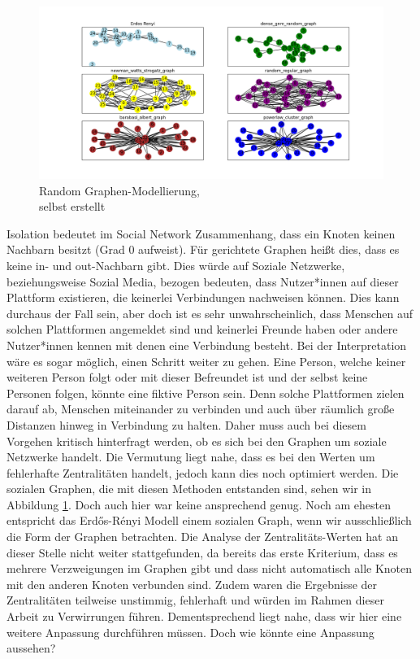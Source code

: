 \FloatBarrier
\begin{figure}[h!]
    \centering
    \hspace*{-1.5cm}
    \includegraphics[width=1.2\textwidth]{Graphics/6Random.png}
    \caption{Random Graphen-Modellierung, \\
    selbst erstellt}
    \label{RandomGraphen}
\end{figure}

\newpage
Isolation bedeutet im Social Network Zusammenhang, dass ein Knoten keinen Nachbarn besitzt (Grad $0$ aufweist).
Für gerichtete Graphen heißt dies, dass es keine in- und out-Nachbarn gibt. Dies würde auf Soziale Netzwerke, beziehungsweise Sozial Media, bezogen bedeuten, dass Nutzer*innen auf dieser Plattform existieren, die keinerlei Verbindungen nachweisen können. Dies kann durchaus der Fall sein, aber doch ist es sehr unwahrscheinlich, dass Menschen auf solchen Plattformen angemeldet sind und keinerlei Freunde haben oder andere Nutzer*innen kennen mit denen eine Verbindung besteht. Bei der Interpretation wäre es sogar möglich, einen Schritt weiter zu gehen. Eine Person, welche keiner weiteren Person folgt oder mit dieser Befreundet ist und der selbst keine Personen folgen, könnte eine fiktive Person sein. Denn solche Plattformen zielen darauf ab, Menschen miteinander zu verbinden und auch über räumlich große Distanzen hinweg in Verbindung zu halten. Daher muss auch bei diesem Vorgehen kritisch hinterfragt werden, ob es sich bei den Graphen um soziale Netzwerke handelt. Die Vermutung liegt nahe, dass es bei den Werten um fehlerhafte Zentralitäten handelt, jedoch kann dies noch optimiert werden.
Die sozialen Graphen, die mit diesen Methoden entstanden sind, sehen wir in Abbildung \ref{RandomGraphen}. Doch auch hier war keine ansprechend genug. Noch am ehesten entspricht das Erdős-Rényi Modell einem sozialen Graph, wenn wir ausschließlich die Form der Graphen betrachten. Die Analyse der Zentralitäts-Werten hat an dieser Stelle nicht weiter stattgefunden, da bereits das erste Kriterium, dass es mehrere Verzweigungen im Graphen gibt und dass nicht automatisch alle Knoten mit den anderen Knoten verbunden sind. Zudem waren die Ergebnisse der Zentralitäten teilweise unstimmig, fehlerhaft und würden im Rahmen dieser Arbeit zu Verwirrungen führen. Dementsprechend liegt nahe, dass wir hier eine weitere Anpassung durchführen müssen. Doch wie könnte eine Anpassung aussehen? 

